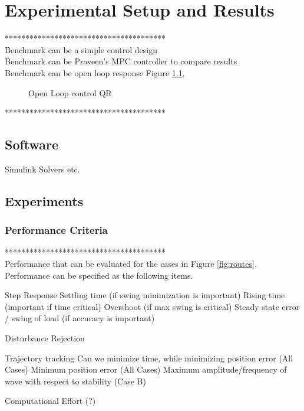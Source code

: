 \chapter{Experimental Setup and Results}\label{ch:results}
***************************************\\
Benchmark can be a simple control design \\
Benchmark can be Praveen's MPC controller to compare results \\
Benchmark can be open loop response Figure \ref{fig:QROL}.
\begin{figure}[h!]
	\centering
	\caption{Open Loop control QR \label{fig:QROL}}
\end{figure}
***************************************\\

\section{Software}
Simulink
Solvers etc.

\section{Experiments}
\subsection{Performance Criteria}
***************************************\\
Performance that can be evaluated for the cases in Figure \ref{fig:routes}. Performance can be specified as the following items.
\begin{outline}
	\1 Step Response
	\2 Settling time (if swing minimization is important)
	\2 Rising time (important if time critical)
	\2 Overshoot (if max swing is critical)
	\2 Steady state error / swing of load (if accuracy is important)
	
	\1 Disturbance Rejection
	
	\1 Trajectory tracking
	\2 Can we minimize time, while minimizing position error (All Cases)
	\2 Minimum position error (All Cases)
	\2 Maximum amplitude/frequency of wave with respect to stability (Case B)
	
	\1 Computational Effort (?)
\end{outline}

